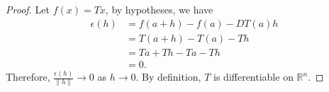 \begin{Exercise}
\begin{proof}
Let $f(x) = Tx$, by hypotheses, we have
\begin{align*}
\epsilon(h)
&= f(a+h) - f(a) - D T(a)h \\
&= T(a+h) - T(a) - Th \\
&= Ta + Th - Ta - Th \\
&= 0.
\end{align*}
Therefore, $\frac{\epsilon(h)}{\| h \|}\to 0$ as $h\to 0$.
By definition, $T$ is differentiable on $\mathbb{R}^n$.
\end{proof}
\end{Exercise}